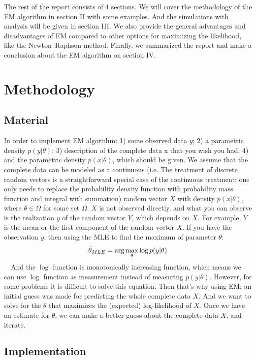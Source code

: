 \documentclass[onecolumn,12pt]{IEEEtran}
\begin{document}
The rest of the report consists of 4 sections. We will cover the methodology of the EM algorithm in section II with some examples. And the simulations with analysis will be given in section III. We also provide the general advantages and disadvantages of EM compared to other options for maximizing the likelihood, like the Newton–Raphson method. Finally, we summarized the report and make a conclusion about the EM algorithm on section IV.


\section{Methodology}
\subsection{Material}
In order to implement EM algorithm: 1) some observed data $y$; 2) a parametric density $p(y|\theta)$; 3) description of the complete data x that you wish you had; 4) and the parametric density $p(x|\theta)$, which should be given.
We assume that the complete data can be modeled as a continuous (i.e. The treatment of discrete random vectors is a straightforward special case of the continuous treatment: one only needs to replace the probability density function with probability mass function and integral with summation) random vector $X$ with density $p(x|\theta)$, where $\theta \in \Omega$ for some set $\Omega$. $X$ is not observed directly, and what you can observe is the realization $y$ of the random vector $Y$, which depends on $X$. For example, $Y$ is the mean or the first component of the random vector $X$.
If you have the observation $y$, then using the MLE to find the maximum of parameter $\theta$:
\begin{equation}
  \hat{\theta}_{MLE} = \arg\max_{\theta} \log p(y|\theta) \\
\end{equation}
~~And the $\log$ function is monotonically increasing function, which means we can use $\log$ function as measurement instead of measuring $p(y|\theta)$. However, for some problems it is difficult to solve this equation. Then that’s why using EM: an initial guess was made for predicting the whole complete data $X$. And we want to solve for the $\theta$ that maximizes the (expected) log-likelihood of $X$. Once we have an estimate for $\theta$, we can make a better guess about the complete data $X$, and iterate.

\subsection{Implementation}
\end{document}
